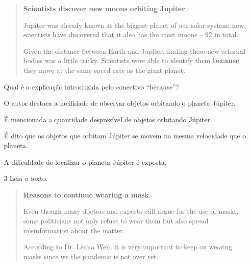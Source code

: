 \begin{quote}
\textbf{Scientists discover new moons orbiting Jupiter}

Jupiter was already known as the biggest planet of our solar system; now, scientists have discovered that it also has the most moons – 92 in total.

Given the distance between Earth and Jupiter, finding these new celestial bodies was a little tricky. Scientists were able to identify them \textbf{because} they move at the same speed rate as the giant planet.

\end{quote}

Qual é a explicação introduzida pelo conectivo ``because''?

\begin{escolha}
\item O autor destaca a facilidade de observar objetos orbitando o planeta
Júpiter.

\item É mencionada a quantidade desprezível de objetos orbitando Júpiter.

\item É dito que os objetos que orbitam Júpiter se movem na mesma
velocidade que o planeta.

\item A dificuldade de localizar o planeta Júpiter é exposta.
\end{escolha}


\num{3} Leia o texto.


\begin{quote}
\textbf{Reasons to continue wearing a mask}

Even though many doctors and experts still argue for the use of masks, some politicians not only refuse to wear them but also spread misinformation about the matter.

According to Dr. Leana Wen, it is very important to keep on wearing masks since we the pandemic is not over yet. 

\end{quote}

